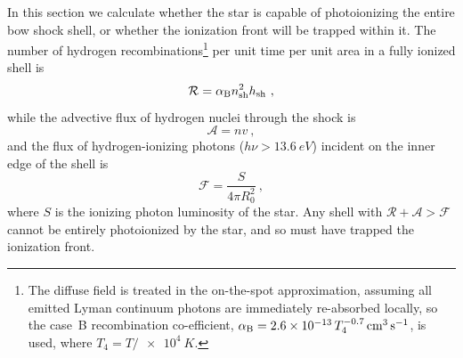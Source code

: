 \message{ !name(dusty-bow-wave.tex)}\documentclass[useAMS, usenatbib, a4paper]{mnras}
\begin{document}
In this section we calculate whether the star is capable of
photoionizing the entire bow shock shell, or whether the ionization
front will be trapped within it.  The number of hydrogen
recombinations\footnote{%
  The diffuse field is treated in the on-the-spot approximation,
  assuming all emitted Lyman continuum photons are immediately
  re-absorbed locally, so the case~B recombination co-efficient,
  \(\alphaB = \num{2.6e-13}\, T_4^{-0.7}\, \si{cm^3.s^{-1}}\), is
  used, where \(T_4 = T/\SI{e4}{K}\).} %
per unit time per unit area in a fully ionized shell is
\begin{equation}
  \label{eq:shell-recombination-rate}
  \mathcal{R} = \alphaB n\shell^2 h\shell \ ,
\end{equation}
while the advective flux of hydrogen nuclei through the shock is 
\begin{equation}
  \label{eq:shell-advective-flux}
  \mathcal{A} = n v \ ,
\end{equation}
and the flux of hydrogen-ionizing photons
(\(h \nu > \SI{13.6}{eV}\)) incident on the inner edge of the shell is
\begin{equation}
  \label{eq:shell-ionizing-flux}
  \mathcal{F} = \frac{S} {4 \pi R_0^2} \ , 
\end{equation}
where \(S\) is the ionizing photon luminosity of the star.  Any shell
with \(\mathcal{R} + \mathcal{A} > \mathcal{F}\) cannot be entirely
photoionized by the star, and so must have trapped the ionization
front.
\end{document}
